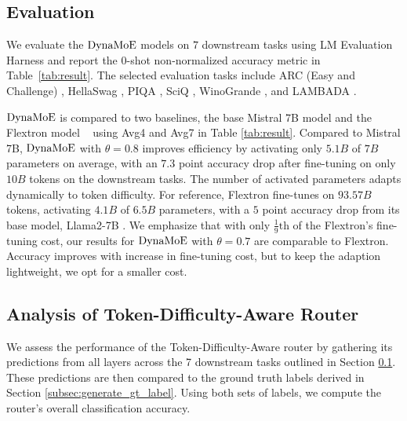 \subsection{Evaluation}
\label{subsec:Evaluation}
We evaluate the $\operatorname{DynaMoE}$ models on $7$ downstream tasks using LM Evaluation Harness \cite{eval-harness} and report the 0-shot non-normalized accuracy metric in Table~\ref{tab:result}. The selected evaluation tasks include ARC (Easy and Challenge) \cite{arc-c-e}, HellaSwag \cite{Zellers2019HellaSwagCA}, PIQA \cite{Bisk2019PIQARA}, SciQ \cite{SciQ}, WinoGrande \cite{Winograd}, and LAMBADA \cite{lambda}.

$\operatorname{DynaMoE}$ is compared to two baselines, the base Mistral 7B model and the Flextron model ~\citep{Cai2024FlextronMF} using Avg4 and Avg7 in Table \ref{tab:result}. Compared to Mistral 7B, $\operatorname{DynaMoE}$ with $\theta=0.8$ improves efficiency by activating only $5.1B$ of $7B$ parameters on average, with an $7.3$ point accuracy drop after fine-tuning on only $10B$ tokens on the downstream tasks. The number of activated parameters adapts dynamically to token difficulty. For reference, Flextron fine-tunes on $93.57B$ tokens, activating $4.1B$ of $6.5B$ parameters, with a $5$ point accuracy drop from its base model, Llama2-7B \cite{LLM2_LLama}. We emphasize that with only $\frac{1}{9}\text{th}$ of the Flextron's fine-tuning cost, our results  for $\operatorname{DynaMoE}$ with $\theta=0.7$  are comparable to Flextron. Accuracy improves with increase in fine-tuning cost, but to keep the adaption lightweight, we opt for a smaller cost.


\subsection{Analysis of Token-Difficulty-Aware Router}
We assess the performance of the Token-Difficulty-Aware router by gathering its predictions from all layers across the 7 downstream tasks outlined in Section \ref{subsec:Evaluation}. These predictions are then compared to the ground truth labels derived in Section \ref{subsec:generate_gt_label}. Using both sets of labels, we compute the router's overall classification accuracy. 

